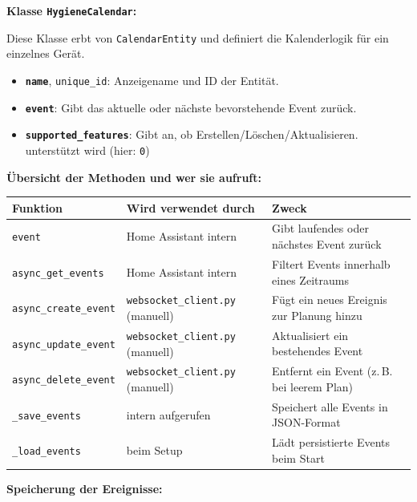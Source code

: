 \vspace{0.5cm}

\textbf{Klasse \texttt{HygieneCalendar}:}

Diese Klasse erbt von \texttt{CalendarEntity} und definiert die Kalenderlogik für ein einzelnes Gerät.

\begin{itemize}
  \item \textbf{\texttt{name}}, \texttt{unique\_id}: Anzeigename und ID der Entität.\\
  \item \textbf{\texttt{event}}: Gibt das aktuelle oder nächste bevorstehende Event zurück.\\
  \item \textbf{\texttt{supported\_features}}: Gibt an, ob Erstellen/Löschen/Aktualisieren. unterstützt wird (hier: \texttt{0})
\end{itemize}

\vspace{0.5cm}

\textbf{Übersicht der Methoden und wer sie aufruft:}

\begin{tabular}{|p{6cm}|p{4.5cm}|p{4cm}|}
\hline
\textbf{Funktion} & \textbf{Wird verwendet durch} & \textbf{Zweck} \\
\hline
\texttt{event} & Home Assistant intern & Gibt laufendes oder nächstes Event zurück \\
\texttt{async\_get\_events} & Home Assistant intern & Filtert Events innerhalb eines Zeitraums \\
\texttt{async\_create\_event} & \texttt{websocket\_client.py} (manuell) & Fügt ein neues Ereignis zur Planung hinzu \\
\texttt{async\_update\_event} & \texttt{websocket\_client.py} (manuell) & Aktualisiert ein bestehendes Event \\
\texttt{async\_delete\_event} & \texttt{websocket\_client.py} (manuell) & Entfernt ein Event (z.\,B. bei leerem Plan) \\
\texttt{\_save\_events} & intern aufgerufen & Speichert alle Events in JSON-Format \\
\texttt{\_load\_events} & beim Setup & Lädt persistierte Events beim Start \\
\hline
\end{tabular}

\vspace{0.5cm}

\textbf{Speicherung der Ereignisse:}

